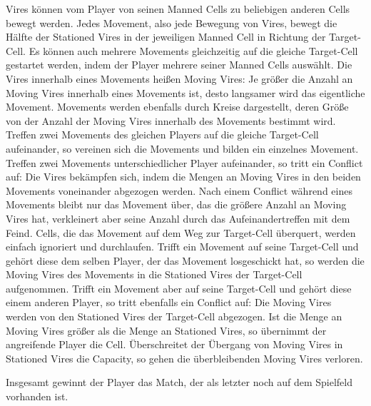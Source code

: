 Vires können vom Player von seinen Manned Cells zu beliebigen anderen Cells bewegt werden. 
Jedes Movement, also jede Bewegung von Vires, bewegt die Hälfte der Stationed Vires in der jeweiligen Manned Cell in Richtung der Target-Cell.
Es können auch mehrere Movements gleichzeitig auf die gleiche Target-Cell gestartet werden, indem der Player mehrere seiner Manned Cells auswählt.
Die Vires innerhalb eines Movements heißen Moving Vires: Je größer die Anzahl an Moving Vires innerhalb eines Movements ist, desto langsamer wird das eigentliche Movement.
Movements werden ebenfalls durch Kreise dargestellt, deren Größe von der Anzahl der Moving Vires innerhalb des Movements bestimmt wird.
Treffen zwei Movements des gleichen Players auf die gleiche Target-Cell aufeinander, so vereinen sich die Movements und bilden ein einzelnes Movement.
Treffen zwei Movements unterschiedlicher Player aufeinander, so tritt ein Conflict auf: Die Vires bekämpfen sich, indem die Mengen an Moving Vires in den beiden Movements voneinander abgezogen werden. Nach einem Conflict während eines Movements bleibt nur das Movement über, das die größere Anzahl an Moving Vires hat, verkleinert aber seine Anzahl durch das Aufeinandertreffen mit dem Feind.
Cells, die das Movement auf dem Weg zur Target-Cell überquert, werden einfach ignoriert und durchlaufen.
Trifft ein Movement auf seine Target-Cell und gehört diese dem selben Player, der das Movement losgeschickt hat, so werden die Moving Vires des Movements in die Stationed Vires der Target-Cell aufgenommen.
Trifft ein Movement aber auf seine Target-Cell und gehört diese einem anderen Player, so tritt ebenfalls ein Conflict auf: Die Moving Vires werden von den Stationed Vires der Target-Cell abgezogen. Ist die Menge an Moving Vires größer als die Menge an Stationed Vires, so übernimmt der angreifende Player die Cell.
Überschreitet der Übergang von Moving Vires in Stationed Vires die Capacity, so gehen die überbleibenden Moving Vires verloren.

Insgesamt gewinnt der Player das Match, der als letzter noch auf dem Spielfeld vorhanden ist.